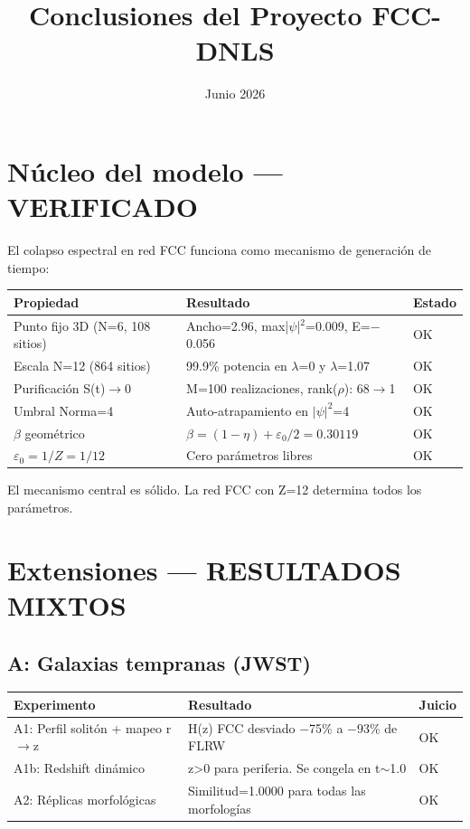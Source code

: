 \documentclass[12pt]{article}
\begin{document}
\title{Conclusiones del Proyecto FCC-DNLS}
\author{}
\date{Junio 2026}
\maketitle

\section{Núcleo del modelo --- VERIFICADO}

El colapso espectral en red FCC funciona como mecanismo de generación de tiempo:

\begin{tabular}{lll}
\toprule
Propiedad & Resultado & Estado \\
\midrule
Punto fijo 3D (N=6, 108 sitios) & Ancho=2.96, max|$\psi$|$^2$=0.009, E=$-$0.056 & OK \\
Escala N=12 (864 sitios) & 99.9\% potencia en $\lambda$=0 y $\lambda$=1.07 & OK \\
Purificación S(t)$\to$0 & M=100 realizaciones, rank($\rho$): 68$\to$1 & OK \\
Umbral Norma=4 & Auto-atrapamiento en $|\psi|^2$=4 & OK \\
$\beta$ geométrico & $\beta = (1-\eta) + \varepsilon_0/2 = 0.30119$ & OK \\
$\varepsilon_0 = 1/Z = 1/12$ & Cero parámetros libres & OK \\
\bottomrule
\end{tabular}

El mecanismo central es sólido. La red FCC con Z=12 determina todos los parámetros.

\section{Extensiones --- RESULTADOS MIXTOS}

\subsection{A: Galaxias tempranas (JWST)}

\begin{tabular}{lll}
\toprule
Experimento & Resultado & Juicio \\
\midrule
A1: Perfil solitón + mapeo r$\to$z & H(z) FCC desviado $-$75\% a $-$93\% de FLRW & OK \\
A1b: Redshift dinámico & z>0 para periferia. Se congela en t$\sim$1.0 & OK \\
A2: Réplicas morfológicas & Similitud=1.0000 para todas las morfologías & OK \\
\bottomrule
\end{tabular}
\end{document}
